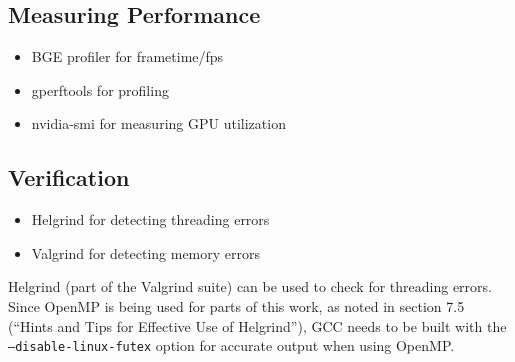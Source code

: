 
\subsection{Measuring Performance}
\ifsummaries
\begin{itemize}
 \item BGE profiler for frametime/fps
 \item gperftools for profiling
 \item nvidia-smi for measuring GPU utilization
\end{itemize}
\fi


\subsection{Verification}
\ifsummaries
\begin{itemize}
 \item Helgrind for detecting threading errors
 \item Valgrind for detecting memory errors
\end{itemize}
\fi

Helgrind (part of the Valgrind suite\cite{valgrind}) can be used to check for threading errors.
Since OpenMP is being used for parts of this work, as noted in section 7.5 (``Hints and Tips for Effective Use of Helgrind'')\cite{hgmanual}, GCC needs to be built with the \texttt{--disable-linux-futex} option for accurate output when using OpenMP.

